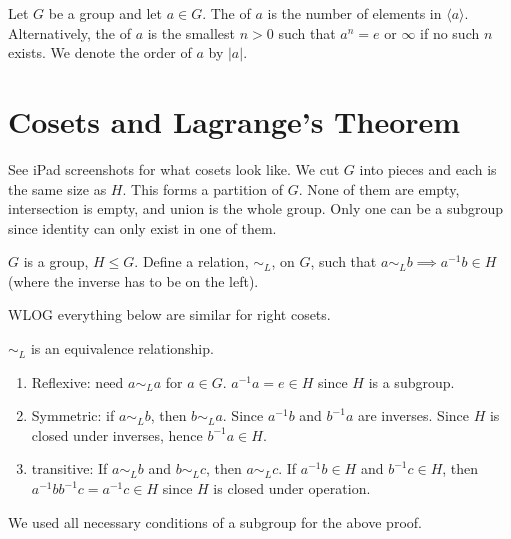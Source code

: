 \documentclass[class=article,crop=false]{standalone}
\begin{document}
\begin{defn}[order]
Let $ G$ be a group and let $ a \in G$. The  of $ a$ is the number of elements in  $ \langle a \rangle$. Alternatively, the  of $ a$ is the smallest  $ n>0$ such that  $ a^{n}=e$ or $ \infty$ if no such $ n$ exists. We denote the order of  $ a$ by  $ |a|$.
\end{defn}

\section{Cosets and Lagrange's Theorem}

See iPad screenshots for what cosets look like. We cut $ G$ into pieces and each is the same size as  $ H$. This forms a partition of $ G$. None of them are empty, intersection is empty, and union is the whole group. Only one can be a subgroup since identity can only exist in one of them.

\begin{defn}[]
	$ G$ is a group,  $ H \leq G$. Define a relation,  $ \sim_L$, on $ G$,  such that $ a \sim_L b \implies a^{-1}b \in H$ (where the inverse has to be on the left).
\end{defn}
WLOG everything below are similar for right cosets.
\begin{thm}[]
$ \sim_L$ is an equivalence relationship.
\end{thm}
\begin{prf}
\begin{enumerate}[label=(\roman*)]
	\item Reflexive: need $ a \sim_L a$ for $ a \in G$. $ a^{-1}a = e \in H$ since $ H$ is a subgroup. 
	\item Symmetric: if $ a \sim_L b$, then $ b \sim_L a$. Since $ a^{-1}b$ and $ b ^{-1} a$ are inverses. Since $ H$ is closed under inverses, hence $ b ^{-1}a \in H$.
	\item transitive: If $ a \sim_L b$ and $ b \sim_L c$, then $ a \sim_L c$. If $ a^{-1} b \in H$ and $ b ^{-1}c \in H$, then $ a^{-1} b b ^{-1} c = a^{-1} c \in H$ since $ H$ is closed under operation.
\end{enumerate}
\end{prf}
\begin{note}[]
We used all necessary conditions of a subgroup for the above proof.
\end{note}
\end{document}
